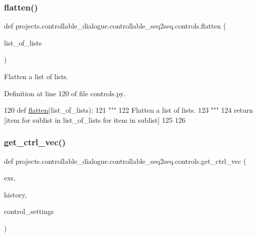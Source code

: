\subsubsection{\texorpdfstring{flatten()}{flatten()}}
{\footnotesize\ttfamily def projects.\+controllable\+\_\+dialogue.\+controllable\+\_\+seq2seq.\+controls.\+flatten (\begin{DoxyParamCaption}\item[{}]{list\+\_\+of\+\_\+lists }\end{DoxyParamCaption})}

\begin{DoxyVerb}Flatten a list of lists.
\end{DoxyVerb}
 

Definition at line 120 of file controls.\+py.


\begin{DoxyCode}
120 \textcolor{keyword}{def }\hyperlink{namespaceprojects_1_1controllable__dialogue_1_1controllable__seq2seq_1_1controls_a0db4b9d9584cef90aa2515a75e741774}{flatten}(list\_of\_lists):
121     \textcolor{stringliteral}{"""}
122 \textcolor{stringliteral}{    Flatten a list of lists.}
123 \textcolor{stringliteral}{    """}
124     \textcolor{keywordflow}{return} [item \textcolor{keywordflow}{for} sublist \textcolor{keywordflow}{in} list\_of\_lists \textcolor{keywordflow}{for} item \textcolor{keywordflow}{in} sublist]
125 
126 
\end{DoxyCode}
\mbox{\label{namespaceprojects_1_1controllable__dialogue_1_1controllable__seq2seq_1_1controls_a3057eb90e6aeff3fbf2c89c7e003aea0}} 
\subsubsection{\texorpdfstring{get\+\_\+ctrl\+\_\+vec()}{get\_ctrl\_vec()}}
{\footnotesize\ttfamily def projects.\+controllable\+\_\+dialogue.\+controllable\+\_\+seq2seq.\+controls.\+get\+\_\+ctrl\+\_\+vec (\begin{DoxyParamCaption}\item[{}]{exs,  }\item[{}]{history,  }\item[{}]{control\+\_\+settings }\end{DoxyParamCaption})}

